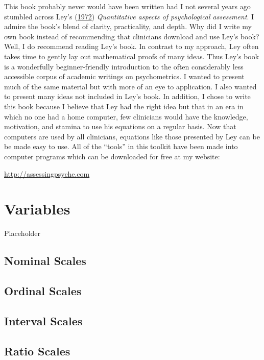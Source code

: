 \documentclass[
]{book}
\begin{document}
This book probably never would have been written had I not several years ago stumbled across Ley's (\protect\hyperlink{ref-ley1972quantitative}{1972}) \emph{Quantitative aspects of psychological assessment}. I admire the book's blend of clarity, practicality, and depth. Why did I write my own book instead of recommending that clinicians download and use Ley's book? Well, I do recommend reading Ley's book. In contrast to my approach, Ley often takes time to gently lay out mathematical proofs of many ideas. Thus Ley's book is a wonderfully beginner-friendly introduction to the often considerably less accessible corpus of academic writings on psychometrics. I wanted to present much of the same material but with more of an eye to application. I also wanted to present many ideas not included in Ley's book. In addition, I chose to write this book because I believe that Ley had the right idea but that in an era in which no one had a home computer, few clinicians would have the knowledge, motivation, and stamina to use his equations on a regular basis. Now that computers are used by all clinicians, equations like those presented by Ley can be be made easy to use. All of the ``tools'' in this toolkit have been made into computer programs which can be downloaded for free at my website:

\url{http://assessingpsyche.com}

\hypertarget{variables}{%
\chapter{Variables}\label{variables}}

Placeholder

\hypertarget{nominal}{%
\section{Nominal Scales}\label{nominal}}

\hypertarget{ordinal-scales}{%
\section{Ordinal Scales}\label{ordinal-scales}}

\hypertarget{interval-scales}{%
\section{Interval Scales}\label{interval-scales}}

\hypertarget{ratio-scales}{%
\section{Ratio Scales}\label{ratio-scales}}
\end{document}
